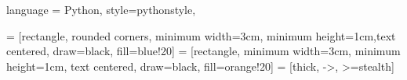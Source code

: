  {
    language = Python,
    style=pythonstyle,
}

\usetikzlibrary{shapes.geometric, arrows.meta, positioning}

 = [rectangle, rounded corners, minimum width=3cm, minimum height=1cm,text centered, draw=black, fill=blue!20]
 = [rectangle, minimum width=3cm, minimum height=1cm, text centered, draw=black, fill=orange!20]
 = [thick, ->, >=stealth]

\usepackage[intoc]{nomencl}
\renewcommand{\nomname}{Symbolverzeichnis}
\renewcommand{\nomlabel}[1]{#1 \dotfill}
\makenomenclature

\usepackage{enumitem,amssymb}

\usepackage{blindtext}

\usepackage{amssymb}